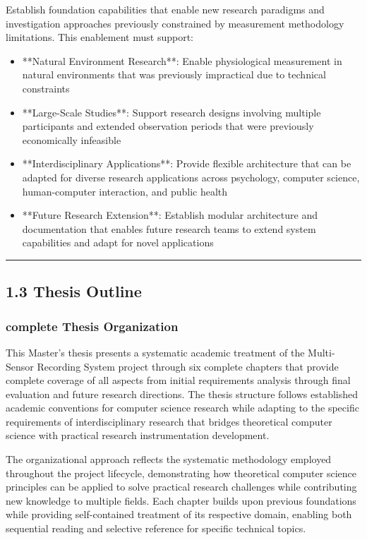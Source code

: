 \documentclass[11pt,a4paper]{article}
\begin{document}
Establish foundation capabilities that enable new research paradigms and
investigation approaches previously constrained
by measurement methodology limitations. This enablement must support:

\begin{itemize}
\item **Natural Environment Research**: Enable physiological measurement in natural environments that was previously
  impractical due to technical constraints
\item **Large-Scale Studies**: Support research designs involving multiple participants and extended observation periods
  that were previously economically infeasible
\item **Interdisciplinary Applications**: Provide flexible architecture that can be adapted for diverse research
  applications across psychology, computer science, human-computer interaction, and
  public health
\item **Future Research Extension**: Establish modular architecture and documentation that enables future
  research teams to extend system capabilities and adapt for novel applications

\end{itemize}
\hrule

\subsection{1.3 Thesis Outline}

\subsubsection{complete Thesis Organization}

This Master's thesis presents a systematic academic treatment of the Multi-Sensor
Recording System project through six
complete chapters that provide complete coverage of all aspects from initial
requirements analysis through final
evaluation and future research directions.  The thesis structure follows established
academic conventions for computer
science research while adapting to the specific requirements of interdisciplinary
research that bridges theoretical
computer science with practical research instrumentation development.

The organizational approach reflects the systematic methodology employed throughout
the project lifecycle, demonstrating
how theoretical computer science principles can be applied to solve practical
research challenges while contributing new
knowledge to multiple fields.  Each chapter builds upon previous foundations while
providing self-contained treatment of
its respective domain, enabling both sequential reading and selective reference for
specific technical topics.
\end{document}
